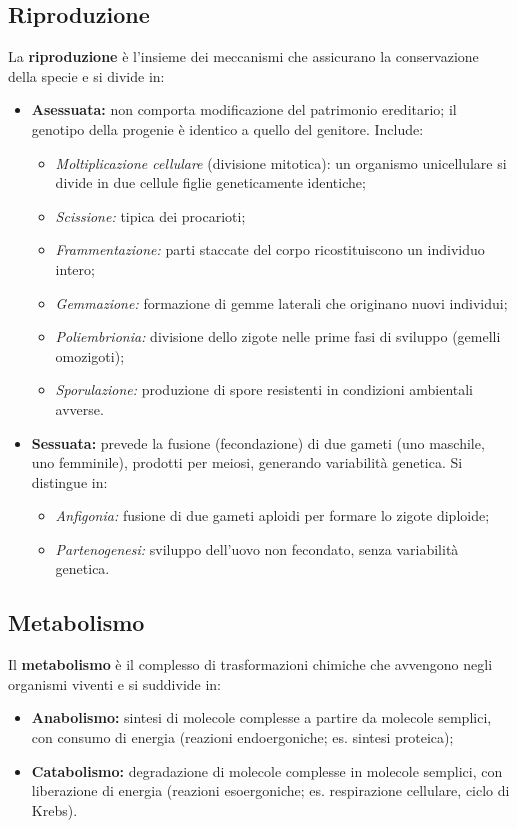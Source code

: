 \documentclass[11pt,a4paper,openright,twoside]{book}
\theoremstyle{definition}
\theoremstyle{plain}
\theoremstyle{remark}
\begin{document}
\subsection{Riproduzione}

La \textbf{riproduzione} è l'insieme dei meccanismi che assicurano la conservazione della specie e si divide in:

\begin{itemize}
  \item \textbf{Asessuata:} non comporta modificazione del patrimonio ereditario; il genotipo della progenie è identico a quello del genitore. Include:
    \begin{itemize}
      \item \textit{Moltiplicazione cellulare} (divisione mitotica): un organismo unicellulare si divide in due cellule figlie geneticamente identiche;
      \item \textit{Scissione:} tipica dei procarioti;
      \item \textit{Frammentazione:} parti staccate del corpo ricostituiscono un individuo intero;
      \item \textit{Gemmazione:} formazione di gemme laterali che originano nuovi individui;
      \item \textit{Poliembrionia:} divisione dello zigote nelle prime fasi di sviluppo (gemelli omozigoti);
      \item \textit{Sporulazione:} produzione di spore resistenti in condizioni ambientali avverse.
    \end{itemize}
  \item \textbf{Sessuata:} prevede la fusione (fecondazione) di due gameti (uno maschile, uno femminile), prodotti per meiosi, generando variabilità genetica. Si distingue in:
    \begin{itemize}
      \item \textit{Anfigonia:} fusione di due gameti aploidi per formare lo zigote diploide;
      \item \textit{Partenogenesi:} sviluppo dell'uovo non fecondato, senza variabilità genetica.
    \end{itemize}
\end{itemize}

\subsection{Metabolismo}

Il \textbf{metabolismo} è il complesso di trasformazioni chimiche che avvengono negli organismi viventi e si suddivide in:
\begin{itemize}
  \item \textbf{Anabolismo:} sintesi di molecole complesse a partire da molecole semplici, con consumo di energia (reazioni endoergoniche; es. sintesi proteica);
  \item \textbf{Catabolismo:} degradazione di molecole complesse in molecole semplici, con liberazione di energia (reazioni esoergoniche; es. respirazione cellulare, ciclo di Krebs).
\end{itemize}
\end{document}
